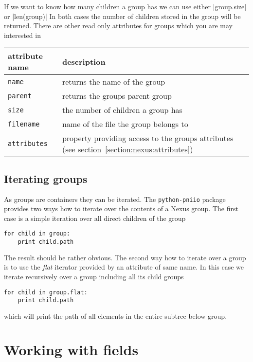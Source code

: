 If we want to know how many children a group has we can use either
|group.size| or |len(group)|
In both cases the number of children stored in the group will be returned.
There are other read only attributes for groups which you are may interested in
\begin{center}
\begin{tabular}{l|l}
attribute name & description \\
\hline \hline
{\tt name} & returns the name of the group \\
\hline
{\tt parent} & returns the groups parent group \\
\hline
{\tt size} & the number of children a group has \\
\hline
{\tt filename} & name of the file the group belongs to \\
\hline
{\tt attributes} & property providing access to the groups attributes (see 
section~\ref{section:nexus:attributes}) \\
\hline
\end{tabular}
\end{center}

\subsection{Iterating groups}

As groups are containers they can be iterated. The {\tt python-pniio}
package provides two ways how to iterate over the contents of a Nexus group. 
The first case is a simple iteration over all direct children of the group
\begin{verbatim}
for child in group:
    print child.path
\end{verbatim}
The result should be rather obvious. The second way how to iterate over a group
is to use the \emph{flat} iterator provided by an attribute of same name. 
In this case we iterate recursively over a group including all its child groups
\begin{verbatim}
for child in group.flat:
    print child.path
\end{verbatim}
which will print the path of all elements in the entire subtree below group.

\section{Working with fields}


